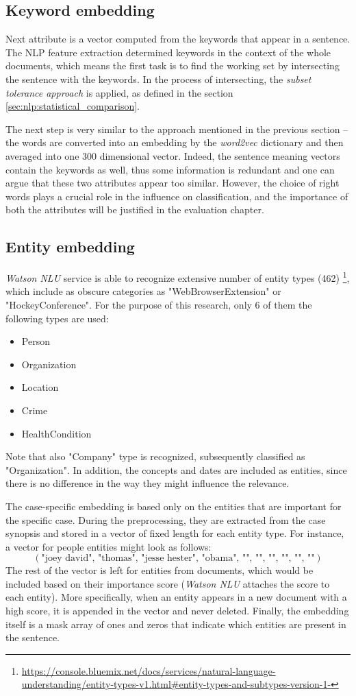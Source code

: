\documentclass[
  digital, %
  notable,   %
  nolof,     %
  nolot,     %
  draft
]{fithesis3}
\begin{document}
\subsection{Keyword embedding}
Next attribute is a vector computed from the keywords that appear in a sentence.
The NLP feature extraction determined keywords in the context of the whole documents, which means the first task is to find the working set by intersecting the sentence with the keywords.
In the process of intersecting, the \textit{subset tolerance approach} is applied, as defined in the section \ref{sec:nlp:statistical_comparison}.

The next step is very similar to the approach mentioned in the previous section -- the words are converted into an embedding by the \textit{word2vec} dictionary and then averaged into one 300 dimensional vector.
Indeed, the sentence meaning vectors contain the keywords as well, thus some information is redundant and one can argue that these two attributes appear too similar.
However, the choice of right words plays a crucial role in the influence on classification, and the importance of both the attributes will be justified in the evaluation chapter.

\subsection{Entity embedding}
\label{sec:entity_embedding}
\textit{Watson NLU} service is able to recognize extensive number of entity types (462) \footnote{\url{https://console.bluemix.net/docs/services/natural-language-understanding/entity-types-v1.html\#entity-types-and-subtypes-version-1-}}, 
which include as obscure categories as "WebBrowserExtension" or "HockeyConference".
For the purpose of this research, only 6 of them the following types are used:
\begin{itemize}
\item Person
\item Organization
\item Location
\item Crime
\item HealthCondition
\end{itemize}
Note that also "Company" type is recognized, subsequently classified as "Organization".
In addition, the concepts and dates are included as entities, since there is no difference in the way they might influence the relevance.

The case-specific embedding is based only on the entities that are important for the specific case.
During the preprocessing, they are extracted from the case synopsis and stored in a vector of fixed length for each entity type. For instance, a vector for people entities might look as follows:
$$
(\text{"joey david", "thomas", "jesse hester", "obama", "", "", "", "", "", ""})
$$
The rest of the vector is left for entities from documents, which would be included based on their importance score (\textit{Watson NLU} attaches the score to each entity).
More specifically, when an entity appears in a new document with a high score, it is appended in the vector and never deleted.
Finally, the embedding itself is a mask array of ones and zeros that indicate which entities are present in the sentence.
\end{document}

